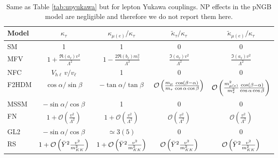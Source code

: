 \documentclass[../report.tex]{subfiles}
\begin{document}
\begin{table}[t]\centering
\begin{tabular}{ l   c  c c c}\toprule[0.1em]
Model	& $\kappa_\tau$ & $\kappa_{\mu(e)}/\kappa_\tau$ & $\tilde \kappa_\tau/\kappa_\tau$ & $\tilde \kappa_{\mu(e)}/\kappa_\tau$ \\ \midrule[0.05em]
SM & 1 & 1 & 0 & 0\\
MFV & $1+\frac{\Re\left(a_\ell\right) v^2}{\Lambda^2}$ &
	$1-\frac{2\Re{\left(b_\ell\right)}m_\tau^2}{\Lambda^2}$ &
	$\frac{\Im\left(a_\ell\right) v^2}{\Lambda^2}$ &
	$\frac{\Im\left(a_\ell\right) v^2}{\Lambda^2}$\\
NFC & $V_{h\ell}\,v/v_\ell$	& 1 &0 &0\\
F2HDM & $\cos\alpha/\sin\beta$	& $-\tan\alpha/\tan\beta$ & $\mathcal{O}\left(\frac{m_\mu}{m_\tau}\frac{\cos(\beta-\alpha)}{\cos\alpha\cos\beta}\right)$ & $\mathcal{O}\left(\frac{m_{\mu(e)}^2}{m_\tau^2} \frac{\cos(\beta-\alpha)}{\cos\alpha\cos\beta}\right)$ \\
MSSM & $-\sin\alpha/\cos\beta$ & 1 & 0 & 0 \\
FN & $1+\mathcal{O}\left(\frac{v^2}{\Lambda^2}\right)$ & $1+\mathcal{O}\left(\frac{v^2}{\Lambda^2}\right)$ & $\mathcal{O}\left(\frac{v^2}{\Lambda^2}\right)$  & $\mathcal{O}\left(\frac{v^2}{\Lambda^2}\right)$ \\
GL2 &  $-\sin\alpha/\cos\beta$ & $\simeq 3(5)$ & 0 & 0 \\
RS & $1+\mathcal{O}\left(\bar Y^2 \frac{v^2}{m_{KK}^2}\right)$ &
	$1+\mathcal{O}\left(\bar Y^2 \frac{v^2}{m_{KK}^2}\right)$ &
	$\mathcal{O}\left(\bar Y^2 \frac{v^2}{m_{KK}^2}\right)$ &
	$\mathcal{O}\left(\bar Y^2 \frac{v^2}{m_{KK}^2}\right)$ \\
\bottomrule[0.1em]
\end{tabular}
\caption{Same as Table \ref{tab:upyukawa} but for lepton Yukawa
  couplings. NP effects in the pNGB model are negligible and therefore we do not report them here.
}
\label{tab:leptyukawa}
\end{table}
\end{document}
